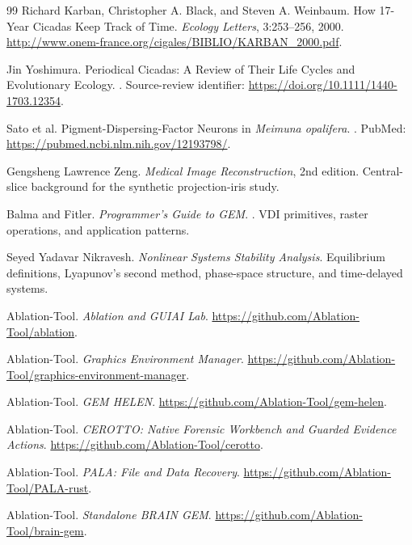 \begin{thebibliography}{99}
Richard Karban, Christopher A. Black, and Steven A. Weinbaum.
\newblock How 17-Year Cicadas Keep Track of Time.
\newblock \emph{Ecology Letters}, 3:253--256, 2000.
\newblock \url{http://www.onem-france.org/cigales/BIBLIO/KARBAN_2000.pdf}.

Jin Yoshimura.
\newblock Periodical Cicadas: A Review of Their Life Cycles and Evolutionary Ecology.
. Source-review identifier: \url{https://doi.org/10.1111/1440-1703.12354}.

Sato et al.
\newblock Pigment-Dispersing-Factor Neurons in \emph{Meimuna opalifera}.
. PubMed: \url{https://pubmed.ncbi.nlm.nih.gov/12193798/}.

Gengsheng Lawrence Zeng.
\newblock \emph{Medical Image Reconstruction}, 2nd edition.
\newblock Central-slice background for the synthetic projection-iris study.

Balma and Fitler.
\newblock \emph{Programmer's Guide to GEM}.
. VDI primitives, raster operations, and application patterns.

Seyed Yadavar Nikravesh.
\newblock \emph{Nonlinear Systems Stability Analysis}.
\newblock Equilibrium definitions, Lyapunov's second method, phase-space structure, and time-delayed systems.

Ablation-Tool.
\newblock \emph{Ablation and GUIAI Lab}.
\newblock \url{https://github.com/Ablation-Tool/ablation}.

Ablation-Tool.
\newblock \emph{Graphics Environment Manager}.
\newblock \url{https://github.com/Ablation-Tool/graphics-environment-manager}.

Ablation-Tool.
\newblock \emph{GEM HELEN}.
\newblock \url{https://github.com/Ablation-Tool/gem-helen}.

Ablation-Tool.
\newblock \emph{CEROTTO: Native Forensic Workbench and Guarded Evidence Actions}.
\newblock \url{https://github.com/Ablation-Tool/cerotto}.

Ablation-Tool.
\newblock \emph{PALA: File and Data Recovery}.
\newblock \url{https://github.com/Ablation-Tool/PALA-rust}.

Ablation-Tool.
\newblock \emph{Standalone BRAIN GEM}.
\newblock \url{https://github.com/Ablation-Tool/brain-gem}.

\end{thebibliography}
